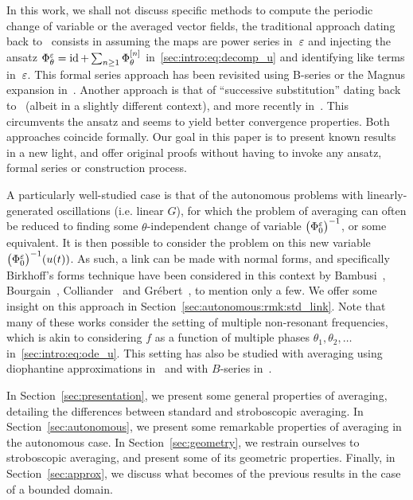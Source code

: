 In this work, we shall not discuss specific methods to compute the
periodic change of variable or the averaged vector fields, the traditional
approach dating back to~\cite{perko.1969.higher} consists in assuming the
maps are power series in~$\varepsilon$ and injecting the ansatz $\Phi^{\varepsilon}_\theta
= \operatorname{id} + \sum_{n \geq 1} \Phi^{[n]}_{\theta}$
in~\eqref{sec:intro:eq:decomp_u} and identifying like terms in~$\varepsilon$.
This formal series approach has been revisited using B-series or the
Magnus expansion in~\cite{chartier.2010.higher,
chartier.2012.formal, casas.2019.continuous}.
%
Another approach is that of ``successive substitution'' dating back
to~\cite{neishtadt.1984.separation} (albeit in a slightly different
context), and more recently in~\cite{castella.2015.stroboscopic,
chartier.2020.new}. This circumvents the ansatz and seems to yield better
convergence properties. Both approaches coincide formally. 
%
Our goal in this paper is to present known results in a new light, and
offer original proofs without having to invoke any ansatz, formal series
or construction process. 

\medskip%
A particularly well-studied case is that of the autonomous problems with
linearly-generated oscillations (i.e. linear $G$), for which the problem
of averaging can often be reduced to finding some $\theta$-independent
change of variable $\big( \Phi^{\varepsilon}_0 \big) ^{-1}$, or some equivalent. It
is then possible to consider the problem on this new variable
$\big(\Phi^{\varepsilon}_0 \big)^{-1} (u(t))$. As such, a link can be made with
normal forms, and specifically Birkhoff's forms technique have been
considered in this context by Bambusi~\cite{bambusi.2003.birkhoff, bambusi.2005.birkhoff-lewis, bambusi.2006.birkhoff, bambusi.2008.birkhoff},
Bourgain~\cite{bourgain.1996.construction},
Colliander~\cite{colliander.2010.transfer, colliander.2012.remark} and
Grébert~\cite{bambusi.2006.birkhoff, grebert.2011.energy,
grebert.2012.resonant}, to mention only a few. We offer some insight on
this approach in Section~\ref{sec:autonomous:rmk:std_link}.
%
Note that many of these works consider the setting of multiple
non-resonant frequencies, which is akin to considering $f$ as a function
of multiple phases $\theta_1, \theta_2, \ldots$
in~\eqref{sec:intro:eq:ode_u}. This setting has also be studied with
averaging using diophantine approximations
in~\cite{chartier.2017.convergence} and with $B$-series
in~\cite{chartier.2012.higher}. 

\bigskip %
In Section~\ref{sec:presentation}, we present some general properties of
averaging, detailing the differences between standard and stroboscopic
averaging. In Section~\ref{sec:autonomous}, we present some remarkable
properties of averaging in the autonomous case. In
Section~\ref{sec:geometry}, we restrain ourselves to stroboscopic
averaging, and present some of its geometric properties. Finally, in
Section~\ref{sec:approx}, we discuss what becomes of the previous results
in the case of a bounded domain. 


